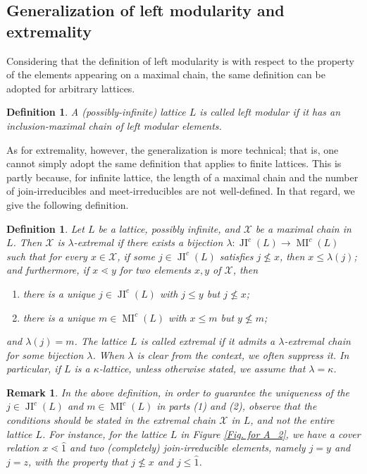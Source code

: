 \documentclass{amsart}
\theoremstyle{thmstyle}
\theoremstyle{exstyle}
\theoremstyle{defstyle}
\newtheorem{definition}[thm]{Definition}
\theoremstyle{remstyle}
\newtheorem{remark}[thm]{Remark}
\theoremstyle{remstyle}
\DeclareMathOperator*{\JI}{JI}
\DeclareMathOperator*{\MI}{MI}
\begin{document}
\subsection{Generalization of left modularity and extremality}\label{Subsection: Generalization of left modularity and extremality for kappa-lattices}

Considering that the definition of left modularity is with respect to the property of the elements appearing on a maximal chain, the same definition can be adopted for arbitrary lattices. 

\begin{definition}\label{Def: Left modularity for arbitrary lattices}
A (possibly-infinite) lattice $L$ is called \emph{left modular} if it has an inclusion-maximal chain of left modular elements.
\end{definition}

As for extremality, however, the generalization is more technical; that is, one cannot simply adopt the same definition that applies to finite lattices. This is partly because, for infinite lattice, the length of a maximal chain and the number of join-irreducibles and meet-irreducibles are not well-defined. In that regard, we give the following definition.

\begin{definition}\label{Def: Extremal for arbitrary lattices}
Let $L$ be a lattice, possibly infinite, and $\mathcal{X}$ be a maximal chain in $L$. Then $\mathcal{X}$ is \emph{$\lambda$-extremal} if there exists a bijection $\lambda: {\JI^c}(L)\to {\MI^c}(L)$ such that for every $x \in \mathcal{X}$, if some $j \in {\JI^c}(L)$ satisfies $j\not\leq x$, then $x\leq \lambda(j)$; and furthermore, if $x\lessdot y$ for two elements $x,y$ of $\mathcal{X}$, then
\begin{enumerate}
    \item there is a unique $j \in {\JI^c}(L)$ with $j \leq y$ but $j \not \leq x$;
    \item there is a unique $m \in {\MI^c}(L)$ with  $x \leq m$ but $y \not \leq m$;
\end{enumerate}
and $\lambda(j)=m$. The lattice $L$ is called \emph{extremal} if it admits a $\lambda$-extremal chain for some bijection $\lambda$. When $\lambda$ is clear from the context, we often suppress it. In particular, if $L$ is a $\kappa$-lattice, unless otherwise stated, we assume that $\lambda=\kappa$.
\end{definition}

\begin{remark}\label{Rem: Technicality in extremality}
In the above definition, in order to guarantee the uniqueness of the $j\in \JI^c(L)$ and $m\in \MI^c(L)$ in parts (1) and (2), observe that the conditions should be stated in the extremal chain $\mathcal{X}$ in $L$, and not the entire lattice $L$. 
For instance, for the lattice $L$ in Figure \ref{Fig. for A_2}, we have a cover relation $x \lessdot \hat{1}$ and two (completely) join-irreducible elements, namely $j=y$ and $j=z$, with the property that $j \not\le x$ and $j \le \hat{1}$. 
\end{remark}
\end{document}
